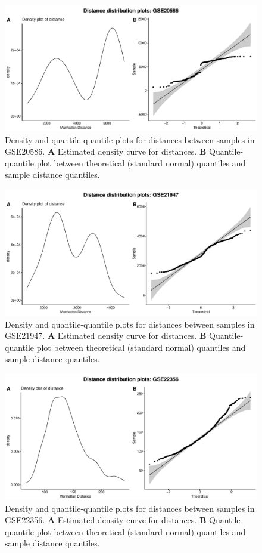 \documentclass[10pt,letterpaper]{article}\usepackage[]{graphicx}\usepackage[]{color}
\begin{document}
\begin{figure}[H]
	\includegraphics[width=\textwidth]{manhattan-distance_hist_GSE20586.pdf}
	\caption{Density and quantile-quantile plots for distances between samples in GSE20586. \textbf{A} Estimated density curve for distances. \textbf{B} Quantile-quantile plot between theoretical (standard normal) quantiles and sample distance quantiles.}
\end{figure}

\begin{figure}[H]
	\includegraphics[width=\textwidth]{manhattan-distance_hist_GSE21947.pdf}
	\caption{Density and quantile-quantile plots for distances between samples in GSE21947. \textbf{A} Estimated density curve for distances. \textbf{B} Quantile-quantile plot between theoretical (standard normal) quantiles and sample distance quantiles.}
\end{figure}

\begin{figure}[H]
	\includegraphics[width=\textwidth]{manhattan-distance_hist_GSE22356.pdf}
	\caption{Density and quantile-quantile plots for distances between samples in GSE22356. \textbf{A} Estimated density curve for distances. \textbf{B} Quantile-quantile plot between theoretical (standard normal) quantiles and sample distance quantiles.}
\end{figure}
\end{document}
